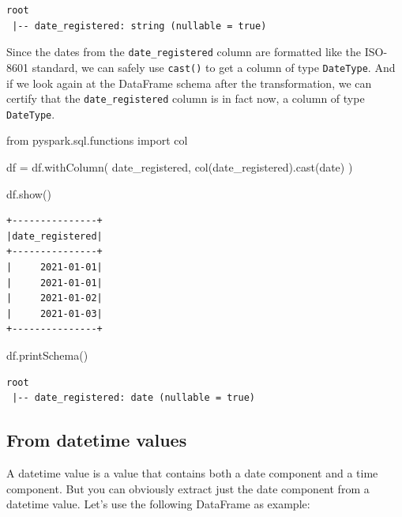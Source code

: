 \documentclass[
  11pt,
  letterpaper,
  DIV=11,
  numbers=noendperiod]{scrreprt}
\newenvironment{Shaded}{\begin{snugshade}}{\end{snugshade}}
\newcommand{\ImportTok}[1]{\textcolor[rgb]{0.00,0.46,0.62}{#1}}
\newcommand{\NormalTok}[1]{\textcolor[rgb]{0.00,0.23,0.31}{#1}}
\newcommand{\OperatorTok}[1]{\textcolor[rgb]{0.37,0.37,0.37}{#1}}
\newcommand{\StringTok}[1]{\textcolor[rgb]{0.13,0.47,0.30}{#1}}
\begin{document}
\begin{verbatim}
root
 |-- date_registered: string (nullable = true)
\end{verbatim}

Since the dates from the \texttt{date\_registered} column are formatted
like the ISO-8601 standard, we can safely use \texttt{cast()} to get a
column of type \texttt{DateType}. And if we look again at the DataFrame
schema after the transformation, we can certify that the
\texttt{date\_registered} column is in fact now, a column of type
\texttt{DateType}.

\begin{Shaded}
\begin{Highlighting}[]
\ImportTok{from}\NormalTok{ pyspark.sql.functions }\ImportTok{import}\NormalTok{ col}

\NormalTok{df }\OperatorTok{=}\NormalTok{ df.withColumn(}
    \StringTok{\textquotesingle{}date\_registered\textquotesingle{}}\NormalTok{,}
\NormalTok{    col(}\StringTok{\textquotesingle{}date\_registered\textquotesingle{}}\NormalTok{).cast(}\StringTok{\textquotesingle{}date\textquotesingle{}}\NormalTok{)}
\NormalTok{)}

\NormalTok{df.show()}
\end{Highlighting}
\end{Shaded}

\begin{verbatim}
+---------------+
|date_registered|
+---------------+
|     2021-01-01|
|     2021-01-01|
|     2021-01-02|
|     2021-01-03|
+---------------+
\end{verbatim}

\begin{Shaded}
\begin{Highlighting}[]
\NormalTok{df.printSchema()}
\end{Highlighting}
\end{Shaded}

\begin{verbatim}
root
 |-- date_registered: date (nullable = true)
\end{verbatim}

\hypertarget{from-datetime-values}{%
\subsection{From datetime values}\label{from-datetime-values}}

A datetime value is a value that contains both a date component and a
time component. But you can obviously extract just the date component
from a datetime value. Let's use the following DataFrame as example:
\end{document}

